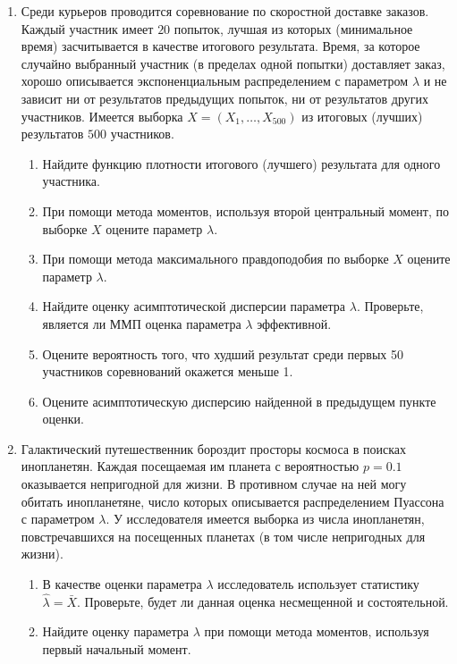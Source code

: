 \begin{enumerate}
\item Среди курьеров проводится соревнование по скоростной доставке заказов. Каждый участник имеет $20$ попыток, 
лучшая из которых (минимальное время) засчитывается в качестве итогового результата. 
Время, за которое случайно выбранный участник (в пределах одной попытки) доставляет заказ, 
хорошо описывается экспоненциальным распределением с параметром $\lambda$ и не зависит ни от результатов предыдущих попыток, 
ни от результатов других участников. Имеется выборка $X=(X_{1},\dots, X_{500})$  из итоговых (лучших) результатов $500$ участников.

\begin{enumerate}
\item Найдите функцию плотности итогового (лучшего) результата для одного участника.
\item При помощи метода моментов, используя второй центральный момент, по выборке $X$  оцените параметр $\lambda$.
\item При помощи метода максимального правдоподобия по выборке $X$  оцените параметр $\lambda$.
\item Найдите оценку асимптотической дисперсии параметра $\lambda$. Проверьте, является ли ММП оценка параметра $\lambda$ эффективной.
\item Оцените вероятность того, что худший результат среди первых 50 участников соревнований окажется меньше 1.
\item Оцените асимптотическую дисперсию найденной в предыдущем пункте оценки.
\end{enumerate}

\item Галактический путешественник бороздит просторы космоса в поисках инопланетян. 
Каждая посещаемая им планета с вероятностью $p=0.1$ оказывается непригодной для жизни. 
В противном случае на ней могу обитать инопланетяне, число которых описывается распределением Пуассона с параметром $\lambda$. 
У исследователя имеется выборка из числа инопланетян, повстречавшихся на посещенных планетах (в том числе непригодных для жизни).

\begin{enumerate}
\item В качестве оценки параметра $\lambda$ исследователь использует статистику $\hat{\lambda} = \bar{X}$. 
Проверьте, будет ли данная оценка несмещенной и состоятельной.

\item Найдите оценку параметра $\lambda$ при помощи метода моментов, используя первый начальный момент.


\end{enumerate}
\end{enumerate}
